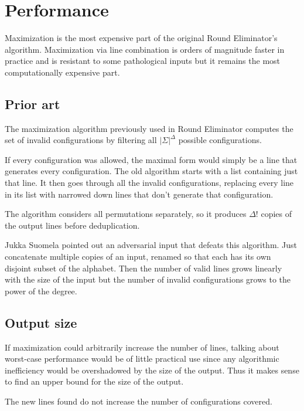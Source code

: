 \documentclass[english, 12pt, a4paper, sci, utf8, a-1b, online]{aaltothesis}
\begin{document}
\section{Performance}

Maximization is the most expensive part of the original Round Eliminator's algorithm. Maximization via line combination is orders of magnitude faster in practice and is resistant to some pathological inputs but it remains the most computationally expensive part. %

\subsection{Prior art}

The maximization algorithm previously used in Round Eliminator computes the set of invalid configurations by filtering all $|\Sigma|^{\Delta}$ possible configurations.

If every configuration was allowed, the maximal form would simply be a line that generates every configuration. The old algorithm starts with a list containing just that line. It then goes through all the invalid configurations, replacing every line in its list with narrowed down lines that don't generate that configuration.

The algorithm considers all permutations separately, so it produces $\Delta!$ copies of the output lines before deduplication.


Jukka Suomela pointed out an adversarial input that defeats this algorithm. Just concatenate multiple copies of an input, renamed so that each has its own disjoint subset of the alphabet. Then the number of valid lines grows linearly with the size of the input but the number of invalid configurations grows to the power of the degree.

\subsection{Output size}

If maximization could arbitrarily increase the number of lines, talking about worst-case performance would be of little practical use since any algorithmic inefficiency would be overshadowed by the size of the output. Thus it makes sense to find an upper bound for the size of the output.

The new lines found do not increase the number of configurations covered.
\end{document}

